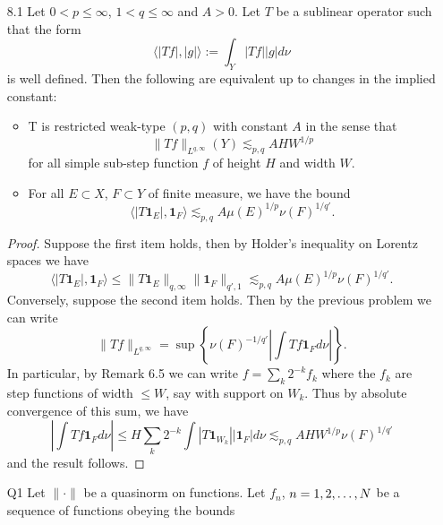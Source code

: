\documentclass[11pt]{article}
\theoremstyle{remark}
\newcommand{\1}{\textbf{1}}
\def\norm#1{\| #1  \|}
\begin{document}
\begin{enumerate}
\begin{proof}
\[\]
Then with $E = \{|f| > \lambda \}$ we have
\[
\mu(E)^{-1/p'} \left| \int f \textbf{1}_E d\mu \right| \geq \mu(\{|f| > \lambda \})^{-1/p'} \lambda \left| \int_X \textbf{1}_E \right| = \lambda \,\mu(\{|f| > \lambda \})^{1/p} > \norm{f}_{L^{p,\infty}} - \epsilon,
\]
thus
\[
\norm{f}_{L^{p,\infty}} \leq \sup\left\{ \mu(E)^{-1/p'} \left| \int f \textbf{1}_E d\mu \right| : 0 < \mu(E) < \infty\right\}.
\] 
To obtain $\gtrsim_p$ part we estimate
\[
\mu(E)^{-1/p'} \left| \int f \textbf{1}_E d\mu \right| \leq \mu(E)^{-1/p'} \norm {f \textbf{1}_E }_{1,1}.
\]
By Holder's we have
\[
\mu(E)^{-1/p'} \norm{ f \textbf{1}_E }_{1,1} \lesssim_{p} \norm{f}_{p,\infty} \norm{\textbf{1}_E}_{p',1} \leq \norm{f}_{p,\infty}.
\]
Taking the supremum on the left yields the result.
\end{proof}
\item[8.1] Let $0 < p \leq \infty$, $1 < q \leq \infty$ and $A > 0$. Let $T$ be a sublinear operator such that the form
\[
\langle |Tf|, |g| \rangle := \int_Y |Tf||g| d \nu
\]
is well defined. Then the following are equivalent up to changes in the implied constant:
\begin{itemize}
\item T is restricted weak-type $(p,q)$ with constant $A$ in the sense that
\[
\|Tf\|_{L^{q,\infty}}(Y) \lesssim_{p,q} A H W^{1/p}
\]
for all simple sub-step function $f$ of height $H$ and width $W$.
\item For all $E \subset X$, $F \subset Y$ of finite measure, we have the bound
\[
\langle |T\1_E|, \1_F \rangle \lesssim_{p,q} A \mu(E)^{1/p} \nu(F)^{1/q'}.
\]
\end{itemize}
\begin{proof}
Suppose the first item holds, then by Holder's inequality on Lorentz spaces we have
\[
\langle |T \1_E|, \1_F \rangle \leq \|T\1_E\|_{q, \infty} \|\1_F\|_{q',1} \lesssim_{p,q} A \mu(E)^{1/p} \nu(F)^{1/q'}.
\]
Conversely, suppose the second item holds. Then by the previous problem we can write
\[
\| T f \|_{L^{q,\infty}}  = \sup \left\{ \nu(F)^{-1/q'} \left| \int T f \textbf{1}_F d\nu \right| \right\}.
\]
In particular, by Remark 6.5 we can write $f = \sum_{k} 2^{-k} f_k$ where the $f_k$ are step functions of width $\leq W$, say with support on $W_k$. Thus by absolute convergence of this sum, we have
\[
\left| \int T f \textbf{1}_F d\nu \right| \leq H \sum_{k} 2^{-k} \int |T \1_{W_k}| |\1_F | d\nu \lesssim_{p,q} A H W^{1/p} \nu(F)^{1/q'}
\]
and the result follows.
\end{proof}
\item[Q1] Let $\| \cdot \|$ be a quasinorm on functions. Let $f_n$, $n =1, 2, \mathellipsis,N$ be a sequence of functions obeying the bounds 

\end{enumerate}
\end{document}
